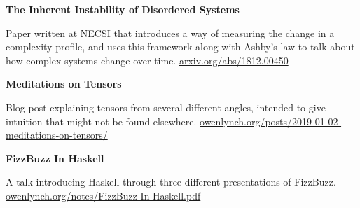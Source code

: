 \documentclass{article}
\renewcommand{\section}[1]{\vspace{1.5em}{\huge \textsc{#1}}\vspace{1em}}
\renewcommand{\subsection}[1]{{\large \textbf{#1}}\vspace{0.5em}}
\newenvironment{row}{\vspace{0.5em}\begin{minipage}[t]{\textwidth}}{\end{minipage}\vspace{0.5em}}
\newenvironment{column2}{%
  \begin{minipage}[t]{0.5\textwidth}%
    \begin{minipage}[t]{0.9\textwidth}}{%
    \end{minipage}%
  \end{minipage}}
\begin{document}
\begin{row}
  \begin{column2}
    \subsection{The Inherent Instability of Disordered Systems}

    Paper written at NECSI that introduces a way of measuring the change in a complexity profile, and uses this framework along with Ashby's law to talk about how complex systems change over time. \href{https://arxiv.org/abs/1812.00450}{arxiv.org/abs/1812.00450}
  \end{column2}
  \begin{column2}
    \subsection{Meditations on Tensors}

    Blog post explaining tensors from several different angles, intended to give intuition that might not be found elsewhere. \href{https://owenlynch.org/posts/2019-01-02-meditations-on-tensors/}{owenlynch.org/posts/2019-01-02-meditations-on-tensors/}
  \end{column2}
\end{row}
\begin{row}
  \begin{column2}
    \subsection{FizzBuzz In Haskell}

    A talk introducing Haskell through three different presentations of FizzBuzz. \href{https://owenlynch.org/notes/FizzBuzz\%20In\%20Haskell.pdf}{owenlynch.org/notes/FizzBuzz In Haskell.pdf}
  \end{column2}
\end{row}

\section{Experience}
\end{document}
